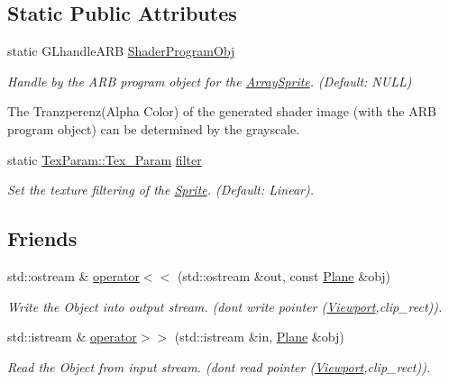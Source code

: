 \subsection*{Static Public Attributes}
\begin{DoxyCompactItemize}
\item 
\hypertarget{class_f2_c_1_1_plane_a42c74f548209280e9028dbcb4d570dc8}{
static GLhandleARB \hyperlink{class_f2_c_1_1_plane_a42c74f548209280e9028dbcb4d570dc8}{ShaderProgramObj}}
\label{class_f2_c_1_1_plane_a42c74f548209280e9028dbcb4d570dc8}

\begin{DoxyCompactList}\small\item\em Handle by the ARB program object for the \hyperlink{class_f2_c_1_1_array_sprite}{ArraySprite}. (Default: NULL) \par
 The Tranzperenz(Alpha Color) of the generated shader image (with the ARB program object) can be determined by the grayscale. \item\end{DoxyCompactList}\item 
\hypertarget{class_f2_c_1_1_plane_aeab80456a34ccc98197171fe20173eec}{
static \hyperlink{namespace_f2_c_1_1_tex_param_a64299c3972944468af4e8b0394c936c6}{TexParam::Tex\_\-Param} \hyperlink{class_f2_c_1_1_plane_aeab80456a34ccc98197171fe20173eec}{filter}}
\label{class_f2_c_1_1_plane_aeab80456a34ccc98197171fe20173eec}

\begin{DoxyCompactList}\small\item\em Set the texture filtering of the \hyperlink{class_f2_c_1_1_sprite}{Sprite}. (Default: Linear). \item\end{DoxyCompactList}\end{DoxyCompactItemize}
\subsection*{Friends}
\begin{DoxyCompactItemize}
\item 
std::ostream \& \hyperlink{class_f2_c_1_1_plane_ab86ad86636c70332835ad8092a10d3ab}{operator$<$$<$} (std::ostream \&out, const \hyperlink{class_f2_c_1_1_plane}{Plane} \&obj)
\begin{DoxyCompactList}\small\item\em Write the Object into output stream. (dont write pointer (\hyperlink{class_f2_c_1_1_viewport}{Viewport},clip\_\-rect)). \item\end{DoxyCompactList}\item 
std::istream \& \hyperlink{class_f2_c_1_1_plane_a8cedc9d1ecc983819d44bc9aacb91299}{operator$>$$>$} (std::istream \&in, \hyperlink{class_f2_c_1_1_plane}{Plane} \&obj)
\begin{DoxyCompactList}\small\item\em Read the Object from input stream. (dont read pointer (\hyperlink{class_f2_c_1_1_viewport}{Viewport},clip\_\-rect)). \item\end{DoxyCompactList}\end{DoxyCompactItemize}


